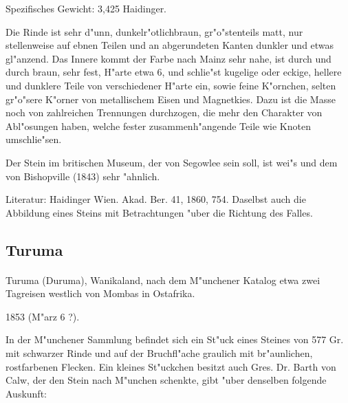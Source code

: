\documentclass[a4paper, 11pt, oneside]{article}
\begin{document}
Spezifisches Gewicht: 3,425 Haidinger.

Die Rinde ist sehr d"unn, dunkelr"otlichbraun, gr"o"stenteils matt, nur stellenweise auf ebnen Teilen und an abgerundeten Kanten dunkler und etwas gl"anzend. Das Innere kommt der Farbe nach Mainz sehr nahe, ist durch und durch braun, sehr fest, H"arte etwa 6, und schlie"st kugelige oder eckige, hellere und dunklere Teile von verschiedener H"arte ein, sowie feine K"ornchen, selten gr"o"sere K"orner von metallischem Eisen und Magnetkies. Dazu ist die Masse noch von zahlreichen Trennungen durchzogen, die mehr den Charakter von Abl"osungen haben, welche fester zusammenh"angende Teile wie Knoten umschlie"sen.

Der Stein im britischen Museum, der von Segowlee sein soll, ist wei"s und dem von Bishopville (1843) sehr "ahnlich.

\footnotesize
Literatur: Haidinger Wien. Akad. Ber. 41, 1860, 754. Daselbst auch die Abbildung eines Steins mit Betrachtungen "uber die Richtung des Falles.

\subsection{Turuma}
\normalsize
\paragraph{}
Turuma (Duruma), Wanikaland, nach dem M"unchener Katalog etwa zwei Tagreisen westlich von Mombas in Ostafrika.

1853 (M"arz 6 ?).

In der M"unchener Sammlung befindet sich ein St"uck eines Steines von 577 Gr. mit schwarzer Rinde und auf der Bruchfl"ache graulich mit br"aunlichen, rostfarbenen Flecken. Ein kleines St"uckchen besitzt auch Gres. Dr. Barth von Calw, der den Stein nach M"unchen schenkte, gibt "uber denselben folgende Auskunft:
\end{document}
